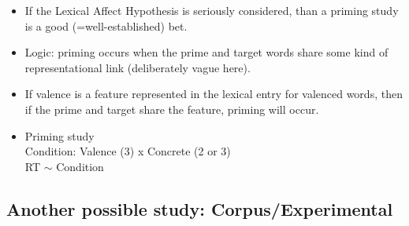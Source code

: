 \documentclass[12pt,letterpaper,table,svgnames,dvipsnames]{article}
\begin{document}
\begin{itemize}
\item If the Lexical Affect Hypothesis is seriously considered, than a priming study is a good (=well-established) bet.

\item Logic: priming occurs when the prime and target words share some kind of representational link (deliberately vague here).

\item If valence is a feature represented in the lexical entry for valenced words, then if the prime and target share the feature, priming will occur.


\item Priming study\\
Condition: Valence (3) x Concrete (2 or 3)\\
RT $\sim$ Condition

\end{itemize} 




\subsection{Another possible study: Corpus/Experimental}
\end{document}
